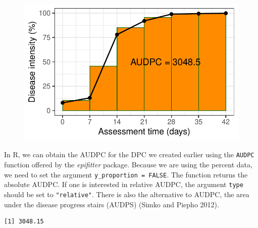 \documentclass[
  letterpaper,
  DIV=11,
  numbers=noendperiod]{scrreprt}
\newenvironment{Shaded}{\begin{snugshade}}{\end{snugshade}}
\newcommand{\AttributeTok}[1]{\textcolor[rgb]{0.40,0.45,0.13}{#1}}
\newcommand{\CommentTok}[1]{\textcolor[rgb]{0.37,0.37,0.37}{#1}}
\newcommand{\ConstantTok}[1]{\textcolor[rgb]{0.56,0.35,0.01}{#1}}
\newcommand{\FunctionTok}[1]{\textcolor[rgb]{0.28,0.35,0.67}{#1}}
\newcommand{\NormalTok}[1]{\textcolor[rgb]{0.00,0.23,0.31}{#1}}
\newcommand{\SpecialCharTok}[1]{\textcolor[rgb]{0.37,0.37,0.37}{#1}}
\newcommand{\StringTok}[1]{\textcolor[rgb]{0.13,0.47,0.30}{#1}}
\begin{document}
\begin{figure}[H]

{\centering \includegraphics{./temporal-dpc_files/figure-pdf/unnamed-chunk-10-1.pdf}

}

\end{figure}

In R, we can obtain the AUDPC for the DPC we created earlier using the
\texttt{AUDPC} function offered by the \emph{epifitter} package. Because
we are using the percent data, we need to set the argument
\texttt{y\_proportion\ =\ FALSE}. The function returns the absolute
AUDPC. If one is interested in relative AUDPC, the argument
\texttt{type} should be set to \texttt{"relative"}. There is also the
alternative to AUDPC, the area under the disease progress stairs (AUDPS)
(Simko and Piepho 2012).

\begin{Shaded}
\end{Shaded}

\begin{verbatim}
[1] 3048.15
\end{verbatim}

\begin{Shaded}
\end{Shaded}
\end{document}
